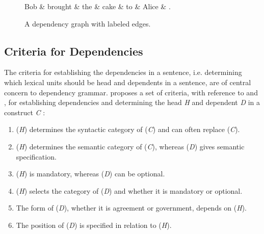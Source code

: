 \begin{figure}
    \begin{dependency}[]
        \begin{deptext}[column sep=1em, row sep=.1ex]
            Bob \& brought \& the \& cake \& to \& Alice \& . \\
        \end{deptext}
    \end{dependency}
    \caption{A dependency graph with labeled edges.}
    \label{dep1}
\end{figure}

\subsection{Criteria for Dependencies}
\label{criteria}

The criteria for establishing the dependencies in a sentence, i.e. determining which lexical units should be head and dependents in a sentence, are of central concern to dependency grammar. \citeauthor{Niv:05} proposes a set of criteria, with reference to \citeauthor{Zwicky:85} and \citeauthor{Hudson:90}, for establishing dependencies and determining the head \textit{H} and dependent \textit{D} in a construct \textit{C} \cite{Zwicky:85, Hudson:90, Niv:05}:

\begin{enumerate}
\item (\textit{H}) determines the syntactic category of (\textit{C}) and can often replace (\textit{C}).
\item (\textit{H}) determines the semantic category of (\textit{C}), whereas (\textit{D}) gives semantic specification.
\item (\textit{H}) is mandatory, whereas (\textit{D}) can be optional.
\item (\textit{H}) selects the category of (\textit{D}) and whether it is mandatory or optional.
\item The form of (\textit{D}), whether it is agreement or government, depends on (\textit{H}).
\item The position of (\textit{D}) is specified in relation to (\textit{H}).
\end{enumerate}

